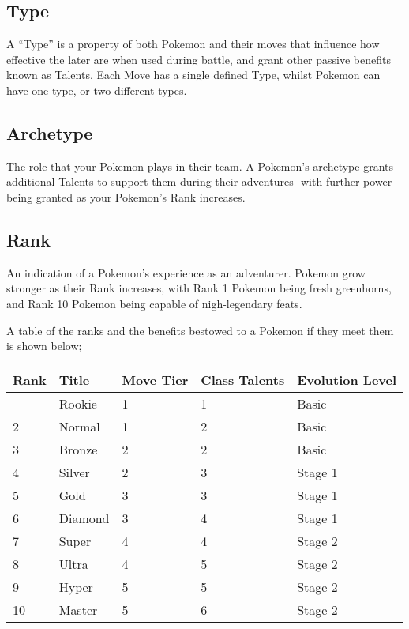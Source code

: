 \documentclass[
  11pt,
  letterpaper,
]{scrbook}
\begin{document}
\subsection{Type}\label{type}

A ``Type'' is a property of both Pokemon and their moves that influence
how effective the later are when used during battle, and grant other
passive benefits known as Talents. Each Move has a single defined Type,
whilst Pokemon can have one type, or two different types.

\subsection{Archetype}\label{archetype}

The role that your Pokemon plays in their team. A Pokemon's archetype
grants additional Talents to support them during their adventures- with
further power being granted as your Pokemon's Rank increases.

\subsection{Rank}\label{rank}

An indication of a Pokemon's experience as an adventurer. Pokemon grow
stronger as their Rank increases, with Rank 1 Pokemon being fresh
greenhorns, and Rank 10 Pokemon being capable of nigh-legendary feats.

A table of the ranks and the benefits bestowed to a Pokemon if they meet
them is shown below;

\begin{longtable}[]{@{}lllll@{}}
\toprule\noalign{}
Rank & Title & Move Tier & Class Talents & Evolution Level \\
\midrule\noalign{}
\endhead
\bottomrule\noalign{}
\endlastfoot
1 & Rookie & 1 & 1 & Basic \\
2 & Normal & 1 & 2 & Basic \\
3 & Bronze & 2 & 2 & Basic \\
4 & Silver & 2 & 3 & Stage 1 \\
5 & Gold & 3 & 3 & Stage 1 \\
6 & Diamond & 3 & 4 & Stage 1 \\
7 & Super & 4 & 4 & Stage 2 \\
8 & Ultra & 4 & 5 & Stage 2 \\
9 & Hyper & 5 & 5 & Stage 2 \\
10 & Master & 5 & 6 & Stage 2 \\
\end{longtable}
\end{document}
